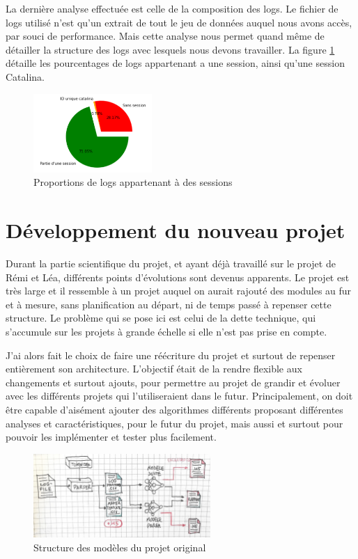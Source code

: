 \documentclass[openany, 11pt]{memoir}
\begin{document}
La dernière analyse effectuée est celle de la composition des \glspl{log}. Le fichier de logs utilisé n'est qu'un extrait de tout le jeu de données auquel nous avons accès, par souci de performance. Mais cette analyse nous permet quand même de détailler la structure des logs avec lesquels nous devons travailler. La figure \ref{proportionsess} détaille les pourcentages de logs appartenant a une session, ainsi qu'une session Catalina.

\begin{figure}[ht]
	\centering
	\includegraphics[width=0.4\textwidth]{images/proportionsess.png}
	\caption{Proportions de logs appartenant à des sessions}
	\label{proportionsess}
\end{figure}

\newpage
\section{Développement du nouveau projet}

Durant la partie scientifique du projet, et ayant déjà travaillé sur le projet de Rémi et Léa, différents points d'évolutions sont devenus apparents. Le projet est très large et il ressemble à un projet auquel on aurait rajouté des modules au fur et à mesure, sans planification au départ, ni de temps passé à repenser cette structure. Le problème qui se pose ici est celui de la dette technique, qui s'accumule sur les projets à grande échelle si elle n'est pas prise en compte.

J'ai alors fait le choix de faire une réécriture du projet et surtout de repenser entièrement son architecture. L'objectif était de la rendre flexible aux changements et surtout ajouts, pour permettre au projet de grandir et évoluer avec les différents projets qui l'utiliseraient dans le futur. Principalement, on doit être capable d'aisément ajouter des algorithmes différents proposant différentes analyses et caractéristiques, pour le futur du projet, mais aussi et surtout pour pouvoir les implémenter et tester plus facilement.

\begin{figure}[ht]
	\centering
	\includegraphics[width=0.6\textwidth]{images/analyselogs.jpg}
	\caption{Structure des modèles du projet original}
	\label{analyselogs}
\end{figure}
\end{document}
